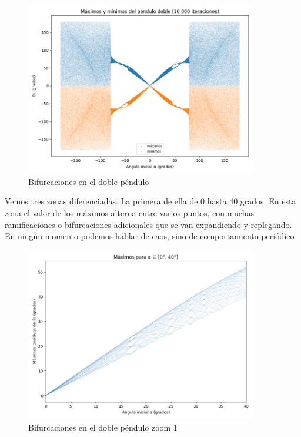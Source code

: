 \documentclass[
  10pt,
  a4paper,
  DIV=11,
  numbers=noendperiod,
  open=any]{scrreprt}
\numberwithin{equation}{chapter}
\numberwithin{equation}{section}
\renewcommand{\[}{\begin{equation}}
\renewcommand{\]}{\end{equation}}
\begin{document}
\begin{figure}[h]
  \centering
  \includegraphics[width=0.9\textwidth]{02-pendulo-doble/BifurcacionesDoble.png}
  \caption{Bifurcaciones en el doble péndulo}
\end{figure}

Vemos tres zonas diferenciadas. La primera de ella de 0 hasta 40 grados.
En esta zona el valor de los máximos alterna entre varios puntos, con
muchas ramificaciones o bifurcaciones adicionales que se van expandiendo
y replegando. En ningún momento podemos hablar de caos, sino de
comportamiento periódico

\begin{figure}[h]
  \centering
  \includegraphics[width=0.9\textwidth]{02-pendulo-doble/BifurcacionesDobleZona1.png}
  \caption{Bifurcaciones en el doble péndulo zoom 1}
\end{figure}
\end{document}
